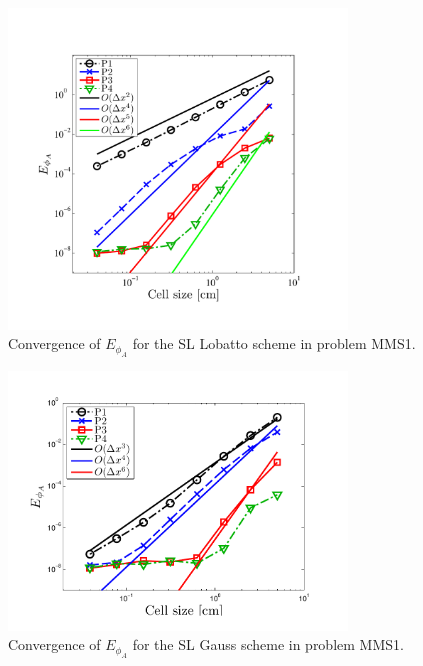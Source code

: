 \begin{figure}[!htp]
\centering
\includegraphics[width=9cm,trim=0.25in  0.5in 0.75in 0.75in,clip=true]{chapter6_grey_radtran/Dissertation_Data/MMS2_SLXS_Lobatto_phi_A.pdf}
\caption{Convergence of $E_{\phi_A}$ for the SL Lobatto scheme in problem MMS1.}
\label{fig:mms1_lobatto_phi_A}
\end{figure}
%
%
\begin{figure}[!hbp]
\centering
\includegraphics[width=9cm,trim=0.25in  0.1in 0.75in 0.5in,clip=true]{chapter6_grey_radtran/Dissertation_Data/MMS2_SLXS_Gauss_phi_A.pdf}
\caption{Convergence of $E_{\phi_A}$ for the SL Gauss scheme in problem MMS1.}
\label{fig:mms1_gauss_phi_A}
\end{figure}
%
%

